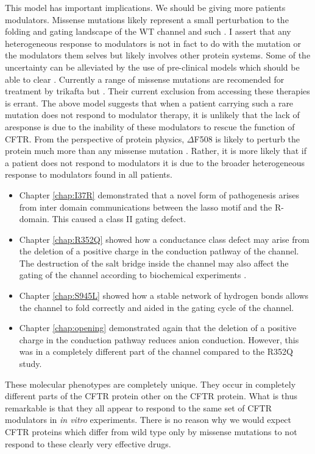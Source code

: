 This model has important implications. We should be giving more patients modulators. Missense mutations likely represent a small perturbation to the folding and gating landscape of the WT channel and such . I assert that any heterogeneous response to modulators is not in fact to do with the mutation or the modulators them selves but likely involves other protein systems. Some of the uncertainty can be alleviated by the use of pre-clinical models which should be able to clear . Currently a range of missense mutations are recomended for treatment by trikafta but . Their current exclusion from accessing these therapies is errant. The above model suggests that when a patient carrying such a rare mutation does not respond to modulator therapy, it is unlikely that the lack of aresponse is due to the inability of these modulators to rescue the function of CFTR. From the perspective of protein physics, $\Delta$F508 is likely to perturb the protein much more than any missense mutation \cite{}. Rather, it is more likely that if a patient does not respond to modulators it is due to the broader heterogeneous response to modulators found in all patients. 
\begin{itemize}
	\item Chapter \ref{chap:I37R} demonstrated that a novel form of pathogenesis arises from inter domain communications between the lasso motif and the R-domain.  This caused a class II gating defect. 
\item Chapter \ref{chap:R352Q} showed how a conductance class defect may arise from the deletion of a positive charge in the conduction pathway of the channel. The destruction of the salt bridge inside the channel may also affect the gating of the channel according to biochemical experiments \cite{}.
\item Chapter \ref{chap:S945L} showed how a stable network of hydrogen bonds allows the channel to fold correctly and aided in the gating cycle of the channel. 
\item Chapter \ref{chap:opening} demonstrated again that the deletion of a positive charge in the conduction pathway reduces anion conduction. However, this was in a completely different part of the channel compared to the R352Q study.
\end{itemize}

These molecular phenotypes are completely unique. They occur in completely different parts of the CFTR protein other on the CFTR protein. What is thus remarkable is that they all appear to respond to the same set of CFTR modulators in \textit{in vitro} experiments. There is no reason why we would expect CFTR proteins which differ from wild type only by missense mutations to not respond to these clearly very effective drugs.

